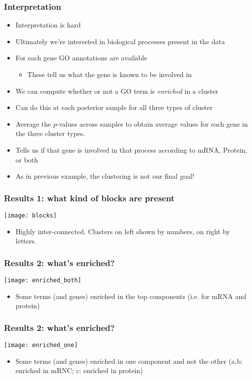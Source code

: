 \begin{frame}
	\frametitle{Interpretation}
	\begin{itemize}
		\item Interpretation is hard
		\item Ultimately we're interested in biological processes present in the data
		\item<2->For each gene \ac{GO} annotations are available
		\begin{itemize}
			\item These tell us what the gene is known to be involved in 
		\end{itemize}
		\item<3->We can compute whether or not a \ac{GO} term is \emph{enriched} in a cluster
		\item<4->Can do this at each posterior sample for all three types of cluster
		\item<5->Average the $p$-values across samples to obtain average values for each gene in the three cluster types.
		\item<6->Tells us if that gene is involved in that process according to mRNA, Protein, or both
		\item<7->As in previous example, the clustering is not our final goal!
	\end{itemize}
\end{frame}

\begin{frame}
	\frametitle{Results 1: what kind of blocks are present}
	\texttt{[image: blocks]}
	\begin{itemize}
		\item Highly inter-connected. Clusters on left shown by numbers, on right by letters.
	\end{itemize}
\end{frame}

\begin{frame}
	\frametitle{Results 2: what's enriched?}
	\texttt{[image: enriched\_both]}
	\begin{itemize}
		\item Some terms (and genes) enriched in the top components (i.e. for mRNA and protein)
	\end{itemize}
\end{frame}

\begin{frame}
	\frametitle{Results 2: what's enriched?}
	\texttt{[image: enriched\_one]}
	\begin{itemize}
		\item Some terms (and genes) enriched in one component and not the other (a,b: enriched in mRNC; c: enriched in protein)
	\end{itemize}
\end{frame}